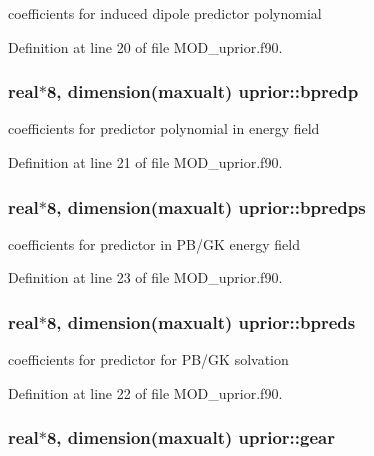 coefficients for induced dipole predictor polynomial 



Definition at line 20 of file M\-O\-D\-\_\-uprior.\-f90.

\hypertarget{classuprior_aa87db88e9448f50c7a59391771b47fe8}{
\subsubsection[{bpredp}]{\setlength{\rightskip}{0pt plus 5cm}real$\ast$8, dimension({\bf maxualt}) uprior\-::bpredp}}\label{classuprior_aa87db88e9448f50c7a59391771b47fe8}


coefficients for predictor polynomial in energy field 



Definition at line 21 of file M\-O\-D\-\_\-uprior.\-f90.

\hypertarget{classuprior_a324305285c84b20f97d84c2b5d11da11}{
\subsubsection[{bpredps}]{\setlength{\rightskip}{0pt plus 5cm}real$\ast$8, dimension({\bf maxualt}) uprior\-::bpredps}}\label{classuprior_a324305285c84b20f97d84c2b5d11da11}


coefficients for predictor in P\-B/\-G\-K energy field 



Definition at line 23 of file M\-O\-D\-\_\-uprior.\-f90.

\hypertarget{classuprior_aa5e518724a69cbdc67f466c84a0f6035}{
\subsubsection[{bpreds}]{\setlength{\rightskip}{0pt plus 5cm}real$\ast$8, dimension({\bf maxualt}) uprior\-::bpreds}}\label{classuprior_aa5e518724a69cbdc67f466c84a0f6035}


coefficients for predictor for P\-B/\-G\-K solvation 



Definition at line 22 of file M\-O\-D\-\_\-uprior.\-f90.

\hypertarget{classuprior_a2dadbbbb706a9081bda32406b6fdd75c}{
\subsubsection[{gear}]{\setlength{\rightskip}{0pt plus 5cm}real$\ast$8, dimension({\bf maxualt}) uprior\-::gear}}\label{classuprior_a2dadbbbb706a9081bda32406b6fdd75c}


